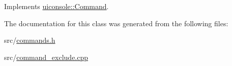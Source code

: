 Implements \hyperlink{classuiconsole_1_1Command_a5c4d205b1de13a6b3d0db73ddc7ebefa}{uiconsole::Command}.



The documentation for this class was generated from the following files:\begin{DoxyCompactItemize}
\item 
src/\hyperlink{commands_8h}{commands.h}\item 
src/\hyperlink{command__exclude_8cpp}{command\_\-exclude.cpp}\end{DoxyCompactItemize}
